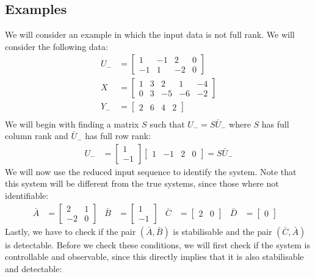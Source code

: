 \subsection{Examples}
We will consider an example in which the input data is not full rank. We will consider the following data:
\begin{align*}
	U_- &= \begin{bmatrix} 1&-1&2&0\\-1&1&-2&0 \end{bmatrix} \\
	X &= \begin{bmatrix} 1&3&2&1&-4\\0&3&-5&-6&-2 \end{bmatrix} \\
	Y_- &= \begin{bmatrix} 2&6&4&2 \end{bmatrix} \\
\end{align*}
We will begin with finding a matrix $S$ such that $U_- = S \bar{U}_-$ where $S$ has full column rank and $\bar{U}_-$ has full row rank:
\begin{align*}
	U_- &= \begin{bmatrix} 1 \\ -1 \end{bmatrix} \begin{bmatrix} 1&-1&2&0 \end{bmatrix} = S\bar{U}_-
\end{align*}
We will now use the reduced input sequence to identify the system. Note that this system will be different from the true systems, since those where not identifiable:
\begin{align*}
\bar{A} &= \begin{bmatrix} 2&1\\-2&0 \end{bmatrix} &
\bar{B} &= \begin{bmatrix} 1\\-1 \end{bmatrix} &
\bar{C} &= \begin{bmatrix} 2&0 \end{bmatrix} &
\bar{D} &= \begin{bmatrix} 0 \end{bmatrix} &
\end{align*}
Lastly, we have to check if the pair $(\bar{A},\bar{B})$ is stabilisable and the pair $(\bar{C},\bar{A})$ is detectable. Before we check these conditions, we will first check if the system is controllable and observable, since this directly implies that it is also stabilisable and detectable:
